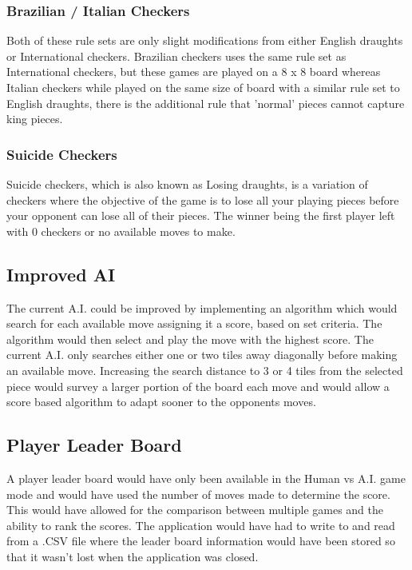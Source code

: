 \documentclass[10pt, a4paper]{article}
\begin{document}
 
 \subsubsection{Brazilian / Italian Checkers}
 Both of these rule sets are only slight modifications from either English draughts or International checkers. Brazilian checkers uses the same rule set as International checkers, but these games are played on a 8 x 8 board whereas Italian checkers while played on the same size of board with a similar rule set to English draughts, there is the additional rule that 'normal' pieces cannot capture king pieces.
 
 
 \subsubsection{Suicide Checkers}
 Suicide checkers, which is also known as Losing draughts, is a variation of checkers where the objective of the game is to lose all your playing pieces before your opponent can lose all of their pieces. The winner being the first player left with 0 checkers or no available moves to make. 
 
 
 \subsection{Improved AI} 
 The current A.I. could be improved by implementing an algorithm which would search for each available move assigning it a score, based on set criteria. The algorithm would then select and play the move with the highest score.    
 The current A.I. only searches either one or two tiles away diagonally before making an available move. Increasing the search distance to 3 or 4 tiles from the selected piece would survey a larger portion of the board each move and would allow a score based algorithm to adapt sooner to the opponents moves.
 
 
 \subsection{Player Leader Board} 
 A player leader board would have only been available in the Human vs A.I. game mode and would have used the number of moves made to determine the score. This would have allowed for the comparison between multiple games and the ability to rank the scores. The application would have had to write to and read from a .CSV file where the leader board information would have been stored so that it wasn't lost when the application was closed.
 
\end{document}
